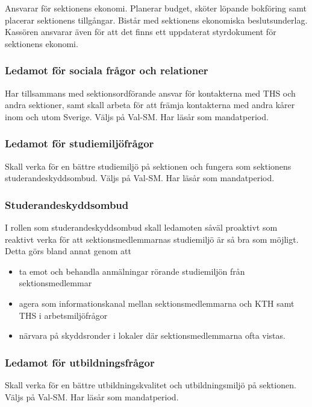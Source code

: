 \documentclass[a4paper,12pt]{article}
\begin{document}
Ansvarar för sektionens ekonomi.
Planerar budget, sköter löpande bokföring samt placerar sektionens tillgångar.
Bistår med sektionens ekonomiska beslutsunderlag.
Kassören ansvarar även för att det finns ett uppdaterat styrdokument för sektionens ekonomi.

\subsubsection{Ledamot för sociala frågor och relationer}

Har tillsammans med sektionsordförande ansvar för kontakterna med THS och andra sektioner,
samt skall arbeta för att främja kontakterna med andra kårer inom och utom Sverige.
Väljs på Val-SM. Har läsår som mandatperiod.

\subsubsection{Ledamot för studiemiljöfrågor}

Skall verka för en bättre studiemiljö på sektionen och fungera som sektionens studerandeskyddsombud.
Väljs på Val-SM. Har läsår som mandatperiod.

\subsubsection{Studerandeskyddsombud}

I rollen som studerandeskyddsombud skall ledamoten såväl proaktivt som reaktivt verka för att sektionsmedlemmarnas studiemiljö är så bra som möjligt. Detta görs bland annat genom att

\begin{itemize}
  \item ta emot och behandla anmälningar rörande studiemiljön från sektionsmedlemmar
  \item agera som informationskanal mellan sektionsmedlemmarna och KTH samt THS i arbetsmiljöfrågor
  \item närvara på skyddsronder i lokaler där sektionsmedlemmarna ofta vistas.
\end{itemize}

\subsubsection{Ledamot för utbildningsfrågor}

Skall verka för en bättre utbildningskvalitet och utbildningsmiljö på sektionen.
Väljs på Val-SM. Har läsår som mandatperiod.
\end{document}
